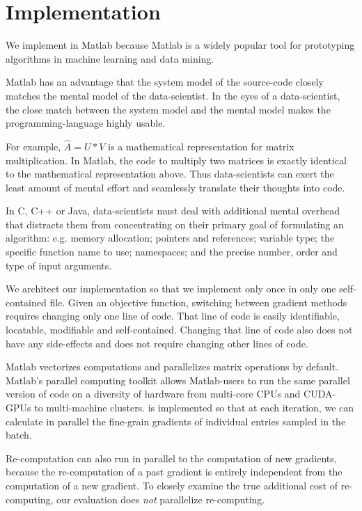 \section{Implementation}
We implement \tool in Matlab because Matlab is a widely popular tool for prototyping algorithms in machine learning and data mining.

Matlab has an advantage that the system model of the source-code closely matches the mental model of the data-scientist.
In the eyes of a data-scientist, the close match between the system model and the mental model makes the programming-language highly usable.

For example, $\hat{A} = U*V$ is a mathematical representation for matrix multiplication.
In Matlab, the code to multiply two matrices is exactly identical to the mathematical representation above.
Thus data-scientists can exert the least amount of mental effort and seamlessly translate their thoughts into code.

In C, C++ or Java, data-scientists must deal with additional mental overhead that distracts them from concentrating on their primary goal of formulating an algorithm: 
e.g. memory allocation; pointers and references; variable type; the specific function name to use; namespaces; and the precise number, order and type of input arguments.


We architect our implementation so that we implement \tool only once in only one self-contained file.
Given an objective function, switching between gradient methods requires changing only one line of code.
That line of code is easily identifiable, locatable, modifiable and self-contained.
Changing that line of code also does not have any side-effects and does not require changing other lines of code.


Matlab vectorizes computations and parallelizes matrix operations by default.
Matlab's parallel computing toolkit allows Matlab-users to run the same parallel version of code on a diversity of hardware from multi-core CPUs and CUDA-GPUs to multi-machine clusters. 
\tool is implemented so that at each iteration, we can calculate in parallel the fine-grain gradients of individual entries sampled in the batch.

Re-computation can also run in parallel to the computation of new gradients, 
because the re-computation of a past gradient is entirely independent from the computation of a new gradient.
To closely examine the true additional cost of re-computing, our evaluation does \emph{not} parallelize re-computing. 
